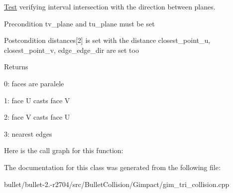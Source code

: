 \hyperlink{class_test}{Test} verifying interval intersection with the direction between planes. 

\begin{DoxyPrecond}{Precondition}
tv\+\_\+plane and tu\+\_\+plane must be set 
\end{DoxyPrecond}
\begin{DoxyPostcond}{Postcondition}
distances\mbox{[}2\mbox{]} is set with the distance closest\+\_\+point\+\_\+u, closest\+\_\+point\+\_\+v, edge\+\_\+edge\+\_\+dir are set too 
\end{DoxyPostcond}
\begin{DoxyReturn}{Returns}

\begin{DoxyItemize}
\item 0\+: faces are paralele
\item 1\+: face U casts face V
\item 2\+: face V casts face U
\item 3\+: nearest edges 
\end{DoxyItemize}
\end{DoxyReturn}


Here is the call graph for this function\+:




The documentation for this class was generated from the following file\+:\begin{DoxyCompactItemize}
\item 
bullet/bullet-\/2.-\/r2704/src/\+Bullet\+Collision/\+Gimpact/gim\+\_\+tri\+\_\+collision.\+cpp\end{DoxyCompactItemize}
